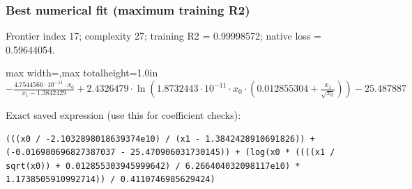 \documentclass[10pt,letterpaper,landscape]{article}
\begin{document}
\begin{minipage}[t]{0.485\textwidth}
\subsubsection*{Best numerical fit (maximum training R2)}
Frontier index 17; complexity 27; training R2 = 0.99998572; native loss = 0.59644054.
\begin{center}\begin{adjustbox}{max width=\linewidth,max totalheight=1.0in}$\displaystyle - \frac{4.7544566 \cdot 10^{-11} \cdot x_{0}}{x_{1} - 1.3842429} + 2.4326479 \cdot \ln{\left(1.8732443 \cdot 10^{-11} \cdot x_{0} \cdot \left(0.012855304 + \frac{x_{1}}{\sqrt{x_{0}}}\right) \right)} - 25.487887$\end{adjustbox}\end{center}
{\scriptsize Exact saved expression (use this for coefficient checks):}
\begin{lstlisting}
(((x0 / -2.1032898018639374e10) / (x1 - 1.3842428910691826)) + (-0.016980696827387037 - 25.470906031730145)) + (log(x0 * ((((x1 / sqrt(x0)) + 0.012855303945999642) / 6.266404032098117e10) * 1.1738505910992714)) / 0.4110746985629424)
\end{lstlisting}
\end{minipage}\hfill
\end{document}
